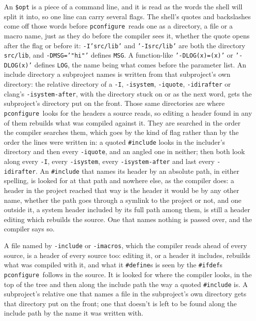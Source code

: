 \documentclass{article}
\newcommand{\pconfigure}{\texttt{pconfigure}}
\begin{document}
An \texttt{\$opt} is a piece of a command line, and it is read as the
words the shell will split it into, so one line can carry several
flags.  The shell's quotes and backslashes come off those words before
\pconfigure\ reads one as a directory, a file or a macro name, just as
they do before the compiler sees it, whether the quote opens after
the flag or before it: \texttt{-I'src/lib'} and \texttt{'-Isrc/lib'}
are both the directory \texttt{src/lib}, and \texttt{-DMSG='"hi"'}
defines \texttt{MSG}.  A function-like \texttt{'-DLOG(x)=(x)'} or
\texttt{'-DLOG(x)'} defines \texttt{LOG}, the name being what comes
before the parameter list.  An include directory a subproject names is written from that
subproject's own directory: the relative directory of a \texttt{-I},
\texttt{-isystem}, \texttt{-iquote}, \texttt{-idirafter} or clang's
\texttt{-isystem-after}, with the directory stuck on or as the next
word, gets the subproject's
directory put on the front.  Those same directories are where
\pconfigure\ looks for the headers a source reads, so editing a header
found in any of them rebuilds what was compiled against it.  They are
searched in the order the compiler searches them, which goes by the
kind of flag rather than by the order the lines were written in: a
quoted \texttt{\#include} looks in the includer's directory and then
every \texttt{-iquote}, and an angled one in neither; then both look
along every \texttt{-I}, every \texttt{-isystem}, every
\texttt{-isystem-after} and last every \texttt{-idirafter}.  An
\texttt{\#include} that names its header by an absolute path, in either
spelling, is looked for at that path and nowhere else, as the compiler
does: a header in the project reached that way is the header it would
be by any other name, whether the path goes through a symlink to the
project or not, and one outside it, a system header included by its
full path among them, is still a header editing which rebuilds the
source.  One that names nothing is passed over, and the compiler says
so.

A file named by \texttt{-include} or \texttt{-imacros}, which the
compiler reads ahead of every source, is a header of every source
too: editing it, or a header it includes, rebuilds what was compiled
with it, and what it \texttt{\#define}s is seen by the
\texttt{\#ifdef}s \pconfigure\ follows in the source.  It is looked
for where the compiler looks, in the top of the tree and then along
the include path the way a quoted \texttt{\#include} is.  A subproject's relative one that names a file in
the subproject's own directory gets that directory put on the front;
one that doesn't is left to be found along the include path by the
name it was written with.
\end{document}
